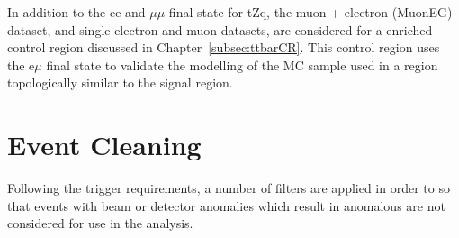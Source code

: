 In addition to the ee and $\mu\mu$ final state for tZq, the muon + electron (MuonEG) dataset, and single electron and muon datasets, are considered for a \ttbar enriched control region discussed in Chapter~\ref{subsec:ttbarCR}. 
This control region uses the e$\mu$ final state to validate the modelling of the \ttbar MC sample used in a region topologically similar to the signal region.


\begin{table}[htbp]
\label{tab:triggersDatasets}
  \centering
\end{table}

\section{Event Cleaning}\label{sec:metFilters}
Following the trigger requirements, a number of filters are applied in order to so that events with beam or detector anomalies which result in anomalous \MET are not considered for use in the analysis.

